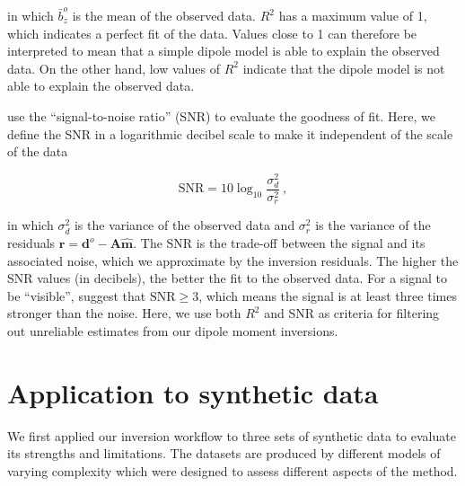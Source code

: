 \noindent
in which $\bar{b}_z^o$ is the mean of the observed data.
$R^2$ has a maximum value of 1, which indicates a perfect fit of the data.
Values close to 1 can therefore be interpreted to mean that a simple dipole model is able to explain the observed data.
On the other hand, low values of $R^2$ indicate that the dipole model is not able to explain the observed data.

\citet{CortesOrtuno2021} use the ``signal-to-noise ratio'' (SNR) to evaluate the goodness of fit.
Here, we define the SNR in a logarithmic decibel scale to make it independent of the scale of the data

\begin{equation}
\label{eq_snr}
\text{SNR} = 10 \log_{10}\dfrac{\sigma^2_d}{\sigma^2_r}\ ,
\end{equation}

\noindent
in which $\sigma^2_d$ is the variance of the observed data and $\sigma^2_r$ is the variance of the residuals $\mathbf{r} = \mathbf{d}^o - \mathbf{A}\hat{\mathbf{m}}$.
The SNR is the trade-off between the signal and its associated noise, which we approximate by the inversion residuals.
The higher the SNR values (in decibels), the better the fit to the observed data.
For a signal to be ``visible'', \citet{Strum2014} suggest that $\text{SNR} \ge 3$, which means the signal is at least three times stronger than the noise.
Here, we use both $R^2$ and SNR as criteria for filtering out unreliable estimates from our dipole moment inversions.


\section{Application to synthetic data}

We first applied our inversion workflow to three sets of synthetic data to evaluate its strengths and limitations.
The datasets are produced by different models of varying complexity which were designed to assess different aspects of the method.

